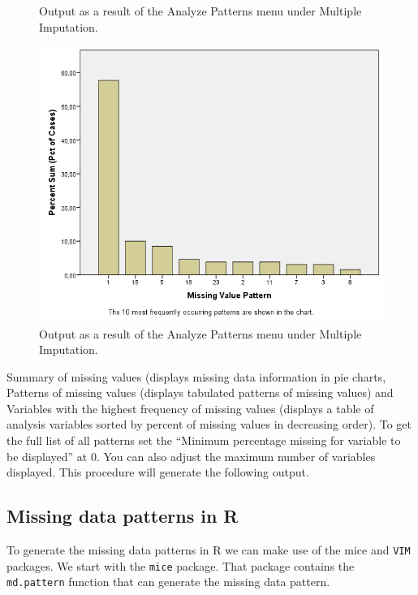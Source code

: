 \documentclass[]{book}
\theoremstyle{definition}
\theoremstyle{definition}
\theoremstyle{definition}
\theoremstyle{remark}
\begin{document}
\begin{figure}
{}

\caption{Output as a result of the Analyze Patterns menu under Multiple Imputation.}\label{fig:fig2-6}
\end{figure}\begin{figure}

{\centering \includegraphics[width=0.9\linewidth]{images/fig2.6d} 

}

\caption{Output as a result of the Analyze Patterns menu under Multiple Imputation.}\label{fig:fig2-6}
\end{figure}

Summary of missing values (displays missing data information in pie
charts, Patterns of missing values (displays tabulated patterns of
missing values) and Variables with the highest frequency of missing
values (displays a table of analysis variables sorted by percent of
missing values in decreasing order). To get the full list of all
patterns set the ``Minimum percentage missing for variable to be
displayed'' at 0. You can also adjust the maximum number of variables
displayed. This procedure will generate the following output.

\subsection{Missing data patterns in
R}\label{missing-data-patterns-in-r}

To generate the missing data patterns in R we can make use of the mice
and \texttt{VIM} packages. We start with the \texttt{mice} package. That
package contains the \texttt{md.pattern} function that can generate the
missing data pattern.
\end{document}
